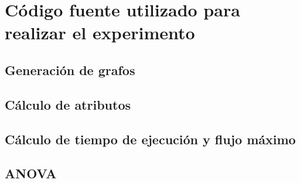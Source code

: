\documentclass{article}
\begin{document}
\section*{Código fuente utilizado para realizar el experimento}

\subsection*{Generación de grafos}

 

\subsection*{Cálculo de atributos}
 

\subsection*{Cálculo de tiempo de ejecución y flujo máximo}



\subsection*{ANOVA}


\newpage


\end{document}
